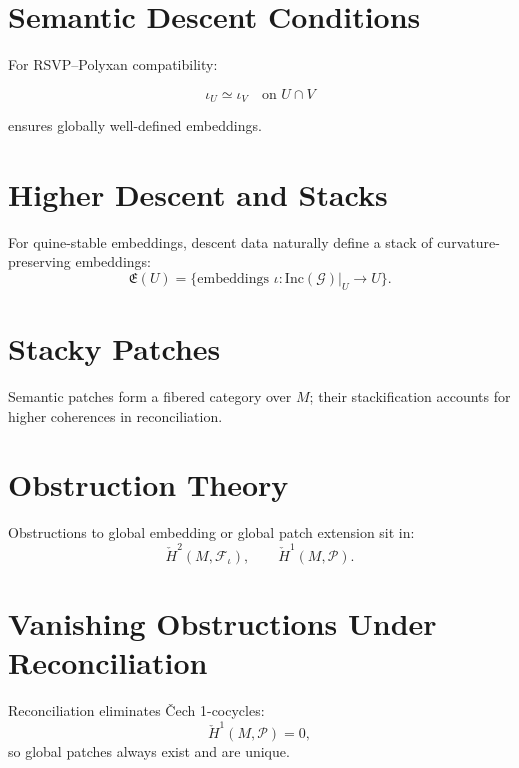 \section{Semantic Descent Conditions}

For RSVP–Polyxan compatibility:

\[
\iota_U \simeq \iota_V \quad \text{on } U\cap V
\]

ensures globally well-defined embeddings.

\section{Higher Descent and Stacks}

For quine-stable embeddings, descent data naturally define a stack of curvature-preserving embeddings:
\[
\mathfrak{E}(U) = \{ \text{embeddings } \iota: \mathrm{Inc}(\mathcal{G})|_U \to U \}.
\]

\section{Stacky Patches}

Semantic patches form a fibered category over $M$; their stackification accounts for higher coherences in reconciliation.

\section{Obstruction Theory}

Obstructions to global embedding or global patch extension sit in:
\[
\check{H}^2(M,\mathcal{F}_\iota),
\qquad
\check{H}^1(M,\mathcal{P}).
\]

\section{Vanishing Obstructions Under Reconciliation}

Reconciliation eliminates Čech 1-cocycles:
\[
\check{H}^1(M,\mathcal{P}) = 0,
\]
so global patches always exist and are unique.


